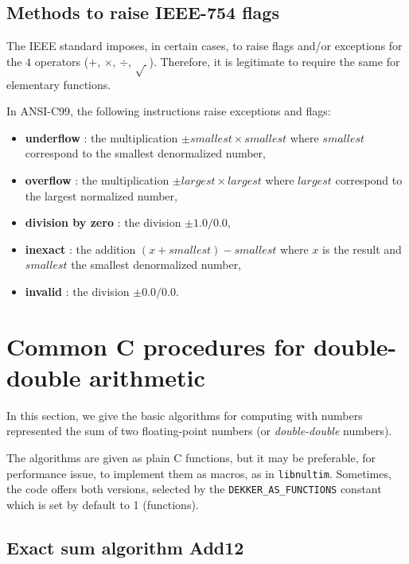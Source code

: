 \subsection{Methods to raise IEEE-754 flags}

The IEEE standard imposes, in certain cases, to raise flags and/or
exceptions for the $4$ operators ($+$, $\times$, $\div$, $\sqrt{~}$).
Therefore, it is legitimate to require the same for elementary
functions.

In ANSI-C99, the following instructions raise exceptions and
flags:

\begin{itemize}
\item {\bf underflow} : the multiplication $\pm smallest \times smallest$ where $smallest$ correspond to the smallest denormalized number,
\item {\bf overflow} : the multiplication  $\pm largest \times largest$ where $largest$ correspond to the largest normalized number,
\item {\bf division by zero} : the division $\pm 1.0/0.0$,
\item {\bf inexact} : the addition $(x + smallest) - smallest$ where $x$ is the result and  $smallest$ the smallest denormalized number,
\item {\bf invalid} : the division $\pm 0.0/0.0$.
\end{itemize}








\section{Common C procedures for double-double arithmetic\label{section:commonCdoubledouble}}

In this section, we give the basic algorithms for computing with
numbers represented the sum of two floating-point numbers (or
\emph{double-double} numbers). 

The algorithms are given as plain C functions, but it may be
preferable, for performance issue, to implement them as macros, as in
\texttt{libnultim}.  Sometimes, the code offers both versions,
selected by the \texttt{DEKKER\_AS\_FUNCTIONS} constant which is set
by default to 1 (functions).


\subsection{Exact sum algorithm {Add12}}

